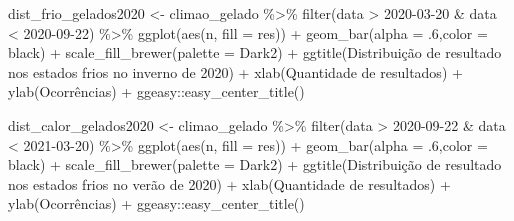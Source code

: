 \documentclass[
]{article}
\newenvironment{Shaded}{\begin{snugshade}}{\end{snugshade}}
\newcommand{\AttributeTok}[1]{\textcolor[rgb]{0.77,0.63,0.00}{#1}}
\newcommand{\DecValTok}[1]{\textcolor[rgb]{0.00,0.00,0.81}{#1}}
\newcommand{\FunctionTok}[1]{\textcolor[rgb]{0.00,0.00,0.00}{#1}}
\newcommand{\NormalTok}[1]{#1}
\newcommand{\OtherTok}[1]{\textcolor[rgb]{0.56,0.35,0.01}{#1}}
\newcommand{\SpecialCharTok}[1]{\textcolor[rgb]{0.00,0.00,0.00}{#1}}
\newcommand{\StringTok}[1]{\textcolor[rgb]{0.31,0.60,0.02}{#1}}
\begin{document}
\begin{Shaded}
\begin{Highlighting}[]
\NormalTok{dist\_frio\_gelados2020 }\OtherTok{\textless{}{-}}\NormalTok{ climao\_gelado }\SpecialCharTok{\%\textgreater{}\%} 
  \FunctionTok{filter}\NormalTok{(data }\SpecialCharTok{\textgreater{}} \StringTok{\textquotesingle{}2020{-}03{-}20\textquotesingle{}} \SpecialCharTok{\&}\NormalTok{ data }\SpecialCharTok{\textless{}} \StringTok{\textquotesingle{}2020{-}09{-}22\textquotesingle{}}\NormalTok{) }\SpecialCharTok{\%\textgreater{}\%}
  \FunctionTok{ggplot}\NormalTok{(}\FunctionTok{aes}\NormalTok{(n, }\AttributeTok{fill =}\NormalTok{ res)) }\SpecialCharTok{+} 
  \FunctionTok{geom\_bar}\NormalTok{(}\AttributeTok{alpha =}\NormalTok{ .}\DecValTok{6}\NormalTok{,}\AttributeTok{color =} \StringTok{\textquotesingle{}black\textquotesingle{}}\NormalTok{) }\SpecialCharTok{+} 
  \FunctionTok{scale\_fill\_brewer}\NormalTok{(}\AttributeTok{palette =} \StringTok{\textquotesingle{}Dark2\textquotesingle{}}\NormalTok{) }\SpecialCharTok{+}
  \FunctionTok{ggtitle}\NormalTok{(}\StringTok{\textquotesingle{}Distribuição de resultado nos estados frios no inverno de 2020\textquotesingle{}}\NormalTok{) }\SpecialCharTok{+}
  \FunctionTok{xlab}\NormalTok{(}\StringTok{\textquotesingle{}Quantidade de resultados\textquotesingle{}}\NormalTok{) }\SpecialCharTok{+} \FunctionTok{ylab}\NormalTok{(}\StringTok{\textquotesingle{}Ocorrências\textquotesingle{}}\NormalTok{) }\SpecialCharTok{+}
\NormalTok{  ggeasy}\SpecialCharTok{::}\FunctionTok{easy\_center\_title}\NormalTok{()}

\NormalTok{dist\_calor\_gelados2020 }\OtherTok{\textless{}{-}}\NormalTok{ climao\_gelado }\SpecialCharTok{\%\textgreater{}\%} 
  \FunctionTok{filter}\NormalTok{(data }\SpecialCharTok{\textgreater{}} \StringTok{\textquotesingle{}2020{-}09{-}22\textquotesingle{}} \SpecialCharTok{\&}\NormalTok{ data }\SpecialCharTok{\textless{}} \StringTok{\textquotesingle{}2021{-}03{-}20\textquotesingle{}}\NormalTok{) }\SpecialCharTok{\%\textgreater{}\%}
  \FunctionTok{ggplot}\NormalTok{(}\FunctionTok{aes}\NormalTok{(n, }\AttributeTok{fill =}\NormalTok{ res)) }\SpecialCharTok{+} 
  \FunctionTok{geom\_bar}\NormalTok{(}\AttributeTok{alpha =}\NormalTok{ .}\DecValTok{6}\NormalTok{,}\AttributeTok{color =} \StringTok{\textquotesingle{}black\textquotesingle{}}\NormalTok{) }\SpecialCharTok{+} 
  \FunctionTok{scale\_fill\_brewer}\NormalTok{(}\AttributeTok{palette =} \StringTok{\textquotesingle{}Dark2\textquotesingle{}}\NormalTok{) }\SpecialCharTok{+}
  \FunctionTok{ggtitle}\NormalTok{(}\StringTok{\textquotesingle{}Distribuição de resultado nos estados frios no verão de 2020\textquotesingle{}}\NormalTok{) }\SpecialCharTok{+}
  \FunctionTok{xlab}\NormalTok{(}\StringTok{\textquotesingle{}Quantidade de resultados\textquotesingle{}}\NormalTok{) }\SpecialCharTok{+} \FunctionTok{ylab}\NormalTok{(}\StringTok{\textquotesingle{}Ocorrências\textquotesingle{}}\NormalTok{) }\SpecialCharTok{+}
\NormalTok{  ggeasy}\SpecialCharTok{::}\FunctionTok{easy\_center\_title}\NormalTok{()}
\end{Highlighting}
\end{Shaded}
\end{document}
